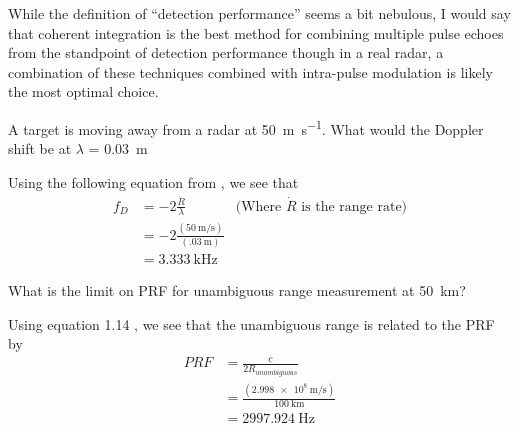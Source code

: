 \documentclass[12pt]{article}
\newenvironment{exercise}[2][Exercise]{\begin{trivlist}
    \item[\hskip \labelsep {\bfseries #1}\hskip \labelsep {\bfseries #2.}]}{\end{trivlist}}
\begin{document}
\begin{exercise}{9}
      While the definition of ``detection performance'' seems a bit nebulous, I would say that coherent integration is the best method for combining multiple pulse echoes from the standpoint of detection performance though in a real radar, a combination of these techniques combined with intra-pulse modulation is likely the most optimal choice.
      \end{exercise}
      
      \begin{exercise}{10}
      A target is moving away from a radar at \SI{50}{\meter\per\second}. What would the Doppler shift be at $\lambda$ = \SI{.03}{\meter}

      Using the following equation from \cite[p.~261]{POMR}, we see that
      \begin{align*}
      f_{D} & = -2\frac{\dot{R}}{\lambda} & \text{(Where $\dot{R}$ is the range rate)}\\
      & = -2\frac{ (\SI{50}{\meter\per\second}) }{ (\SI{.03}{\meter}) }\\
      & = \SI{3.333}{\kHz}
      \end{align*}
      \end{exercise}
      
      \begin{exercise}{11}
      What is the limit on PRF for unambiguous range measurement at \SI{50}{\km}?

      Using equation 1.14 \cite[p.~22]{POMR}, we see that the unambiguous range is related to the PRF by
      \begin{align*}
      PRF & = \frac{c}{2 R_{unambiguous}}\\
      & = \frac{ (\SI{2.998e8}{\meter\per\second}) }{\SI{100}{\km}}\\
      & = \SI{2997.924}{\Hz}
      \end{align*}
      \end{exercise}
      
\end{document}
